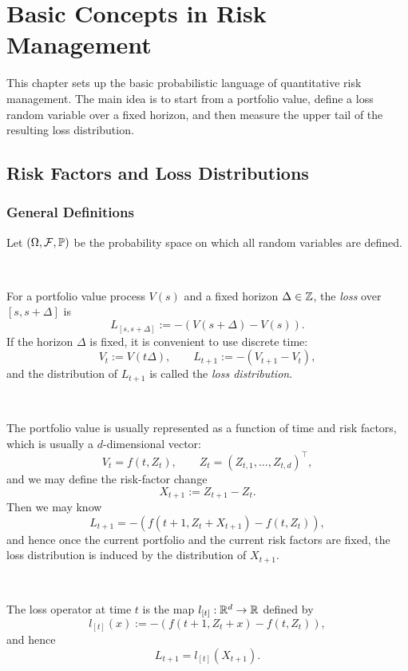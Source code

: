 \section{Basic Concepts in Risk Management}

This chapter sets up the basic probabilistic language of quantitative risk management. The main idea is to start from a portfolio value, define a loss random variable over a fixed horizon, and then measure the upper tail of the resulting loss distribution.

\subsection{Risk Factors and Loss Distributions}

\subsubsection{General Definitions}

    Let $(\Omega,\mathcal{F},\mathbb{P})$ be the probability space on which all random variables are defined. 

\begin{definition}\ \par
    For a portfolio value process $V(s)$ and a fixed horizon $\Delta \in \mathbb{Z}$, the \emph{loss} over $[s,s+\Delta]$ is
\[
    L_{[s,s+\Delta]}:=-(V(s+\Delta)-V(s)).
\]
    If the horizon $\Delta$ is fixed, it is convenient to use discrete time:
\[
    V_t:=V(t\Delta),\qquad
    L_{t+1}:=-(V_{t+1}-V_t),
\]
and the distribution of $L_{t+1}$ is called the \emph{loss distribution}.
\end{definition}

\begin{definition}\ \par
The portfolio value is usually represented as a function of time and risk factors, which is usually a $d$-dimensional vector:
\[
    V_t=f(t,Z_t),\qquad
    Z_t=(Z_{t,1},\ldots,Z_{t,d})^\top,
\] and we may define the risk-factor change
\[
    X_{t+1}:=Z_{t+1}-Z_t.
\]
Then we may know
\[
    L_{t+1}
    =-\left(f(t+1,Z_t+X_{t+1})-f(t,Z_t)\right),
\]
and hence once the current portfolio and the current risk factors are fixed, the loss distribution is induced by the distribution of $X_{t+1}$.
\end{definition}

\begin{definition}\ \par
The loss operator at time $t$ is the map $l_{[t]}:\mathbb{R}^d\to\mathbb{R}$ defined by
\[
    l_{[t]}(x):=-\left(f(t+1,Z_t+x)-f(t,Z_t)\right),
\]
and hence
\[
    L_{t+1}=l_{[t]}(X_{t+1}).
\]
\end{definition}

